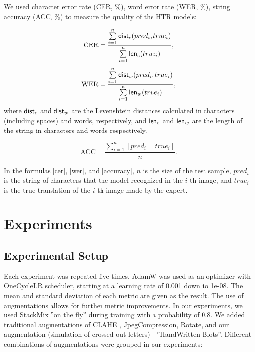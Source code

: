 \documentclass[10pt,twocolumn,letterpaper]{article}
\begin{document}
We used character error rate (CER, $\%$), word error rate (WER, $\%$), string accuracy (ACC, $\%$) to measure the quality of the HTR models:

\begin{equation}\label{cer}
{\text{CER}} = \frac{\sum\limits_{i=1}^n {\sf dist}_c (pred_i, true_i)}{\sum\limits_{i=1}^n {\sf len}_c (true_i)},
\end{equation}
\begin{equation}\label{wer}
{\text{WER}} = \frac{\sum\limits_{i=1}^n {\sf dist}_w (pred_i,true_i)}{\sum\limits_{i=1}^n {\sf len}_w (true_i)},
\end{equation}
where ${\sf dist}_c$ and ${\sf dist}_w$ are the Levenshtein distances calculated in characters (including spaces) and words, respectively, and ${\sf len}_c$ and ${\sf len}_w$ are the length of the string in characters and words respectively.

\begin{equation}\label{accuracy}
{\text{ACC}} = \frac{\sum\limits_{i=1}^n [pred_i = true_i]}{n}.
\end{equation}

In the formulas \eqref{cer}, \eqref{wer}, and \eqref{accuracy}, $n$ is the size of the test sample, $pred_i$ is the string of characters that the model recognized in the $i$-th image, and $true_i$ is the true translation of the $i$-th image made by the expert.

\section{Experiments}


\subsection{Experimental Setup}

Each experiment was repeated five times. AdamW was used as an optimizer \cite{adamW} with OneCycleLR scheduler, starting at a learning rate of 0.001 down to 1e-08. The mean and standard deviation of each metric are given as the result. The use of augmentations allows for further metric improvements. In our experiments, we used StackMix ”on the fly” during training with a probability of 0.8. We added traditional augmentations of CLAHE \cite{Reza2004}, JpegCompression, Rotate, and our augmentation (simulation of crossed-out letters) - ”HandWritten Blots”. Different combinations of augmentations were grouped in our experiments:
\end{document}
